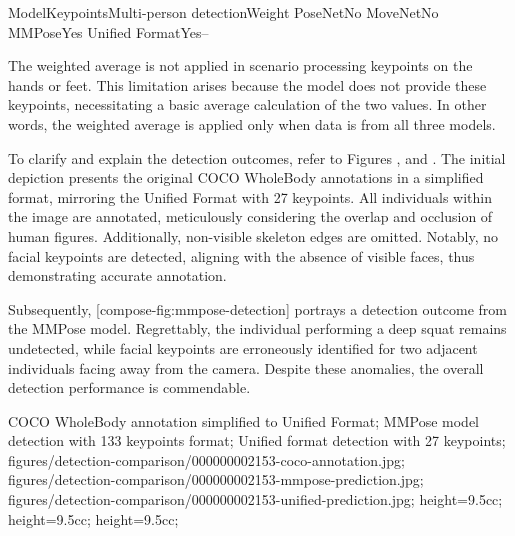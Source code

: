  \setupTABLE[r][1][style=bold]
 \setupTABLE[c][each][offset=3dd]
 \setupTABLE[frame=off]
 \setupTABLE[r][1][topframe=on,bottomframe=on]
 \setupTABLE[c][each][leftframe=on]
 \setupTABLE[c][1][leftframe=off]
 \setupTABLE[c][2,3,4][align=middle]
 \bTR\bTD Model\eTD\bTD Keypoints\eTD\bTD Multi-person detection\eTD\bTD Weight\eTD\eTR
 \bTR\bTD PoseNet\eTD{}\eTD\bTD No\eTD{}\eTD\eTR
 \bTR\bTD MoveNet\eTD{}\eTD\bTD No\eTD{}\eTD\eTR
 \bTR\bTD MMPose\eTD{}\eTD\bTD Yes\eTD{}\eTD\eTR
 \bTR\bTD Unified Format\eTD{}\eTD\bTD Yes\eTD\bTD --\eTD\eTR


The weighted average is not applied in scenario processing keypoints on the hands or feet. This limitation arises because the  model does not provide these keypoints, necessitating a basic average calculation of the two values. In other words, the weighted average is applied only when data is from all three models.

To clarify and explain the detection outcomes, refer to Figures ,  and . The initial depiction presents the original COCO WholeBody annotations in a simplified format, mirroring the Unified Format with 27 keypoints. All individuals within the image are annotated, meticulously considering the overlap and occlusion of human figures. Additionally, non-visible skeleton edges are omitted. Notably, no facial keypoints are detected, aligning with the absence of visible faces, thus demonstrating accurate annotation.

Subsequently, [compose-fig:mmpose-detection] portrays a detection outcome from the MMPose model. Regrettably, the individual performing a deep squat remains undetected, while facial keypoints are erroneously identified for two adjacent individuals facing away from the camera. Despite these anomalies, the overall detection performance is commendable.

 {
 COCO WholeBody annotation simplified to Unified Format;
 MMPose model detection with 133 keypoints format;
 Unified format detection with 27 keypoints;
 }
 {
 figures/detection-comparison/000000002153-coco-annotation.jpg;
 figures/detection-comparison/000000002153-mmpose-prediction.jpg;
 figures/detection-comparison/000000002153-unified-prediction.jpg;
 }
 {
 height=9.5cc;
 height=9.5cc;
 height=9.5cc;
 }

